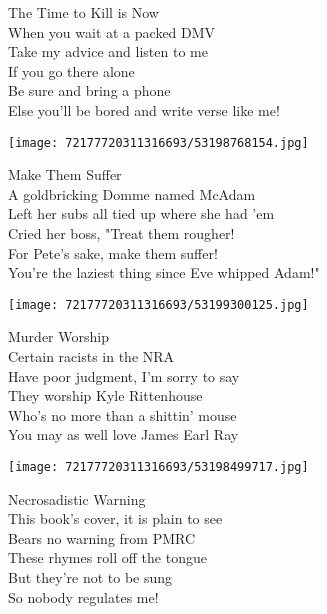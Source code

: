 \documentclass[10pt,letterpaper]{article}
\begin{document}
\begin{center}
The Time to Kill is Now\\
\vskip 0.2in
When you wait at a packed DMV\\
Take my advice and listen to me\\
If you go there alone\\
Be sure and bring a phone\\
Else you'll be bored and write verse like me!\\
\end{center}
\pagebreak

\begin{center}
\texttt{[image: 72177720311316693/53198768154.jpg]}
\end{center}

\begin{center}
Make Them Suffer\\
\vskip 0.2in
A goldbricking Domme named McAdam\\
Left her subs all tied up where she had 'em\\
Cried her boss, "Treat them rougher!\\
For Pete's sake, make them suffer!\\
You're the laziest thing since Eve whipped Adam!"\\
\end{center}
\pagebreak

\begin{center}
\texttt{[image: 72177720311316693/53199300125.jpg]}
\end{center}

\begin{center}
Murder Worship\\
\vskip 0.2in
Certain racists in the NRA\\
Have poor judgment, I'm sorry to say\\
They worship Kyle Rittenhouse\\
Who's no more than a shittin' mouse\\
You may as well love James Earl Ray\\
\end{center}
\pagebreak

\begin{center}\texttt{[image: 72177720311316693/53198499717.jpg]}
\end{center}
\begin{center}
Necrosadistic Warning\\
\vskip 0.2in
This book's cover, it is plain to see\\
Bears no warning from PMRC\\
These rhymes roll off the tongue\\
But they're not to be sung\\
So nobody regulates me!\\
\end{center}
\pagebreak
\end{document}
